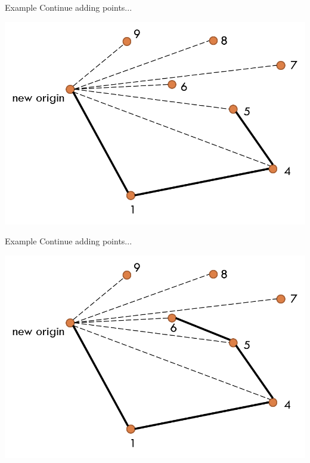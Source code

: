 \documentclass[13pt,onlymath]{beamer}
\begin{document}
\begin{frame}{Example}
Continue adding points...
\begin{center}
\includegraphics[height=0.5\textheight]{figures/graham7}
\end{center}
\end{frame}

\begin{frame}{Example}
Continue adding points...
\begin{center}
\includegraphics[height=0.5\textheight]{figures/graham8}
\end{center}
\end{frame}
\end{document}
